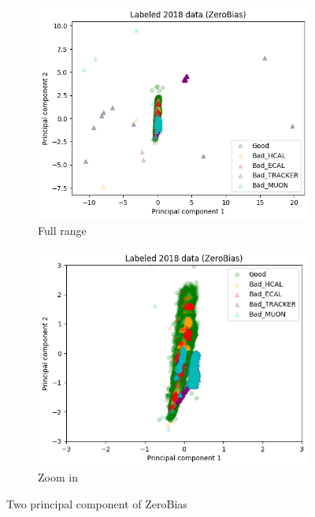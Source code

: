 \begin{figure}[h!]
\begin{subfigure}[b]{0.49\linewidth}
        \includegraphics[width=\linewidth]{images/reco/2018/ZeroBias_subsystem_label.png}
        \caption{Full range}
    \end{subfigure}
    \begin{subfigure}[b]{0.49\linewidth}
        \includegraphics[width=\linewidth]{images/reco/2018/ZeroBias_subsystem_label_short_range.png}
        \caption{Zoom in}
    \end{subfigure}
    \caption{Two principal component of ZeroBias}
\label{fig:2018_ZeroBias_subsystem_label}
\end{figure}

